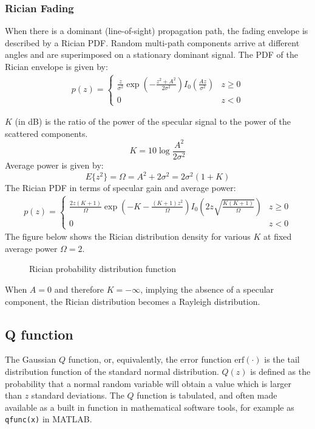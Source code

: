 \subsubsection{Rician Fading}
When there is a dominant (line-of-sight) propagation path, the fading envelope is described by a Rician \gls{PDF}\cite{AWGN}. Random multi-path components arrive at different angles and are superimposed on a stationary dominant signal. The \gls{PDF} of the Rician envelope is given by:
\begin{align*}
	p(z) =
	\begin{cases}
		\frac{z}{\sigma^2} \exp \left(-\frac{z^2 + A^2}{2\sigma^2}\right)I_0\left(\frac{Az}{\sigma^2}\right) & z \geq 0 \\
		0 & z < 0
	\end{cases}
\end{align*}
\begin{mathDef}
\end{mathDef}
\(K\) (in dB) is the ratio of the power of the specular signal to the power of the scattered components\cite{Hindu}.
\[
	K = 10 \log \frac{A^2}{2\sigma^2}
\]
Average power is given by:
\[
	E\{z^2\} = \Omega = A^2 + 2\sigma^2 = 2\sigma^2(1 + K)
\]
The Rician \gls{PDF} in terms of specular gain and average power:
\begin{align*}
	p(z) =
	\begin{cases}
		\frac{2z(K+1)}{\Omega} \exp \left(-K-\frac{(K+1)z^2}{\Omega}\right)I_0\left(2z\sqrt{\frac{K(K+1)}{\Omega}}\right) & z \geq 0 \\
		0 & z < 0
	\end{cases}
\end{align*}
The figure below shows the Rician distribution density for various \(K\) at fixed average power \(\Omega = 2\).
\begin{figure}[!h]
	\centering
	\resizebox{0.8\textwidth}{!}{}
	\caption{Rician probability distribution function}
\end{figure}

When \(A=0\) and therefore \(K=-\infty\), implying the absence of a specular component, the Rician distribution becomes a Rayleigh distribution.

\subsection{Q function}
The Gaussian \(Q\) function, or, equivalently, the error function \(\text{erf}(\cdot)\) is the tail distribution function of the standard normal distribution. \(Q(z)\) is defined as the probability that a normal random variable will obtain a value which is larger than \(z\) standard deviations\cite{qfuncber}.
The \(Q\) function is tabulated, and often made available as a built in function in mathematical software tools, for example as \texttt{qfunc(x)} in MATLAB.


